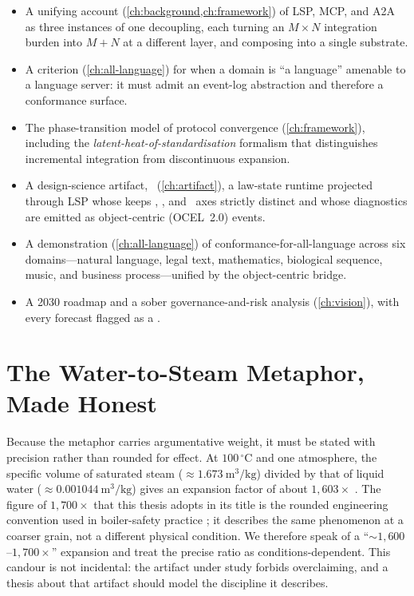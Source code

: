 \begin{itemize}[leftmargin=2.2em]
  \item[\textbf{C1}] A unifying account (\cref{ch:background,ch:framework}) of
  LSP, MCP, and A2A as three instances of one decoupling, each turning an
  $M \times N$ integration burden into $M + N$ at a different layer, and
  composing into a single substrate.
  \item[\textbf{C2}] A criterion (\cref{ch:all-language}) for when a domain is
  ``a language'' amenable to a language server: it must admit an event-log
  abstraction and therefore a conformance surface.
  \item[\textbf{C3}] The phase-transition model of protocol convergence
  (\cref{ch:framework}), including the \emph{latent-heat-of-standardisation}
  formalism that distinguishes incremental integration from discontinuous
  expansion.
  \item[\textbf{C4}] A design-science artifact, \lspmax\ (\cref{ch:artifact}), a
  law-state runtime projected through LSP whose  keeps
  \admitted, , and \unknownstat\ axes strictly distinct and whose
  diagnostics are emitted as object-centric (OCEL~2.0) events.
  \item[\textbf{C5}] A demonstration (\cref{ch:all-language}) of
  conformance-for-all-language across six domains---natural language, legal text,
  mathematics, biological sequence, music, and business process---unified by the
  object-centric bridge.
  \item[\textbf{C6}] A 2030 roadmap and a sober governance-and-risk analysis
  (\cref{ch:vision}), with every forecast flagged as a \forecast.
\end{itemize}

\section{The Water-to-Steam Metaphor, Made Honest}
\label{sec:metaphor-intro}

Because the metaphor carries argumentative weight, it must be stated with
precision rather than rounded for effect. At $100\,^{\circ}\mathrm{C}$ and one
atmosphere, the specific volume of saturated steam ($\approx 1.673\
\mathrm{m^3/kg}$) divided by that of liquid water ($\approx 0.001044\
\mathrm{m^3/kg}$) gives an expansion factor of about $1{,}603\times$
\citep{engtoolbox-steam,phys-illinois-steam}. The figure of $1{,}700\times$ that
this thesis adopts in its title is the rounded engineering convention used in
boiler-safety practice \citep{nationalboard-steam}; it describes the same
phenomenon at a coarser grain, not a different physical condition. We therefore
speak of a ``${\sim}1{,}600$--$1{,}700\times$'' expansion and treat the precise
ratio as conditions-dependent. This candour is not incidental: the artifact under
study forbids overclaiming, and a thesis about that artifact should model the
discipline it describes.

